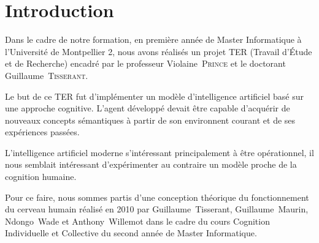 \chapter*{Introduction}
Dans le cadre de notre formation, en première année de Master Informatique à l'Université de Montpellier 2, nous avons réalisés un projet TER (Travail d'Étude et de Recherche) encadré par le professeur \mbox{Violaine \textsc{Prince}} et le doctorant \mbox{Guillaume \textsc{Tisserant}}.

Le but de ce TER fut d'implémenter un modèle d'intelligence artificiel basé sur une approche cognitive. L'agent développé devait être capable d'acquérir de nouveaux concepts sémantiques à partir de son environnent courant et de ses expériences passées.

L'intelligence artificiel moderne s'intéressant principalement à être opérationnel, il nous semblait intéressant d'expérimenter au contraire un modèle proche de la cognition humaine. 

Pour ce faire, nous sommes partis d'une conception théorique du fonctionnement du cerveau humain réalisé en 2010 par \mbox{Guillaume Tisserant}, \mbox{Guillaume Maurin}, \mbox{Ndongo Wade} et \mbox{Anthony Willemot} dans le cadre du cours \og Cognition Individuelle et Collective\fg{} du second année de Master Informatique.

